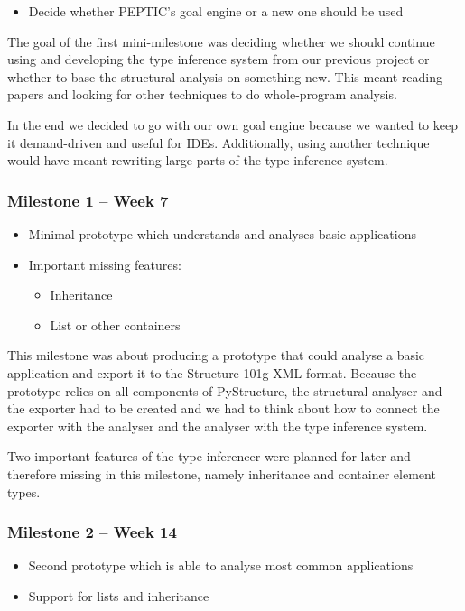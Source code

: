\documentclass[12pt,halfparskip,DIV11,BCOR10mm]{scrreprt}
\begin{document}
\begin{itemize}
    \item Decide whether PEPTIC's goal engine or a new one should be used
\end{itemize}

The goal of the first mini-milestone was deciding whether we should continue using and developing the type inference system from our previous project or whether to base the structural analysis on something new. This meant reading papers and looking for other techniques to do whole-program analysis.

In the end we decided to go with our own goal engine because we wanted to keep it demand-driven and useful for IDEs. Additionally, using another technique would have meant rewriting large parts of the type inference system.

\subsubsection{Milestone 1 – Week 7}

\begin{itemize}
    \item Minimal prototype which understands and analyses basic applications
    \item Important missing features:
    \begin{itemize}
        \item Inheritance
        \item List or other containers
    \end{itemize}
\end{itemize}

This milestone was about producing a prototype that could analyse a basic application and export it to the Structure 101g XML format. Because the prototype relies on all components of PyStructure, the structural analyser and the exporter had to be created and we had to think about how to connect the exporter with the analyser and the analyser with the type inference system.

Two important features of the type inferencer were planned for later and therefore missing in this milestone, namely inheritance and container element types.

\subsubsection{Milestone 2 – Week 14}

\begin{itemize}
    \item Second prototype which is able to analyse most common applications
    \item Support for lists and inheritance
\end{itemize}
\end{document}
